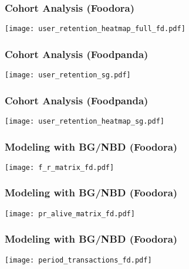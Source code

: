 \documentclass{beamer} %
\theoremstyle{definition} %
\begin{document}
\begin{frame}
\frametitle{Cohort Analysis (Foodora)}

\begin{center}
            \texttt{[image: user\_retention\_heatmap\_full\_fd.pdf]}
        \end{center}
\end{frame}

\begin{frame}
\frametitle{Cohort Analysis (Foodpanda)}

\begin{center}
            \texttt{[image: user\_retention\_sg.pdf]}
        \end{center}
\end{frame}

\begin{frame}
\frametitle{Cohort Analysis (Foodpanda)}

\begin{center}
            \texttt{[image: user\_retention\_heatmap\_sg.pdf]}
        \end{center}
\end{frame}

\begin{frame}
\frametitle{Modeling with BG/NBD (Foodora)}
\begin{center}
            \texttt{[image: f\_r\_matrix\_fd.pdf]}
        \end{center}
\end{frame}

\begin{frame}
\frametitle{Modeling with BG/NBD (Foodora)}
\begin{center}
            \texttt{[image: pr\_alive\_matrix\_fd.pdf]}
        \end{center}
\end{frame}

\begin{frame}
\frametitle{Modeling with BG/NBD (Foodora)}
\begin{center}
            \texttt{[image: period\_transactions\_fd.pdf]}
        \end{center}
\end{frame}
\end{document}
